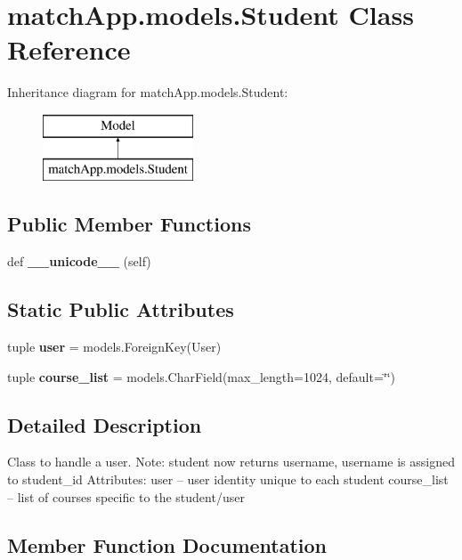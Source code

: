 \section{match\+App.\+models.\+Student Class Reference}
\label{classmatch_app_1_1models_1_1_student}
Inheritance diagram for match\+App.\+models.\+Student\+:\begin{figure}[H]
\begin{center}
\leavevmode
\includegraphics[height=2.000000cm]{classmatch_app_1_1models_1_1_student}
\end{center}
\end{figure}
\subsection*{Public Member Functions}
\begin{DoxyCompactItemize}
\item 
def {\bf \+\_\+\+\_\+unicode\+\_\+\+\_\+} (self)
\end{DoxyCompactItemize}
\subsection*{Static Public Attributes}
\begin{DoxyCompactItemize}
\item 
tuple {\bf user} = models.\+Foreign\+Key(User)
\item 
tuple {\bf course\+\_\+list} = models.\+Char\+Field(max\+\_\+length=1024, default=\char`\"{}\char`\"{})
\end{DoxyCompactItemize}


\subsection{Detailed Description}
\begin{DoxyVerb}Class to handle a user. 
Note: student now returns username, username is assigned to student_id 
Attributes: 
user -- user identity unique to each student
course_list -- list of courses specific to the student/user
\end{DoxyVerb}
 

\subsection{Member Function Documentation}
